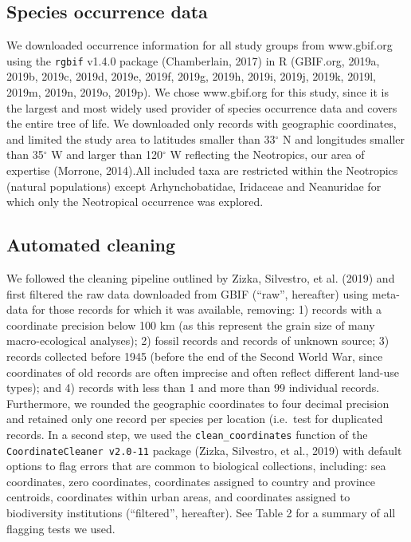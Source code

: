 \documentclass[
  12pt,
]{article}
\begin{document}
\hypertarget{species-occurrence-data}{%
\subsection{Species occurrence data}\label{species-occurrence-data}}

We downloaded occurrence information for all study groups from www.gbif.org using the \texttt{rgbif} v1.4.0 package (Chamberlain, 2017) in R (GBIF.org, 2019a, 2019b, 2019c, 2019d, 2019e, 2019f, 2019g, 2019h, 2019i, 2019j, 2019k, 2019l, 2019m, 2019n, 2019o, 2019p). We chose www.gbif.org for this study, since it is the largest and most widely used provider of species occurrence data and covers the entire tree of life. We downloaded only records with geographic coordinates, and limited the study area to latitudes smaller than 33\(^\circ\) N and longitudes smaller than 35\(^\circ\) W and larger than 120\(^\circ\) W reflecting the Neotropics, our area of expertise (Morrone, 2014).All included taxa are restricted within the Neotropics (natural populations) except Arhynchobatidae, Iridaceae and Neanuridae for which only the Neotropical occurrence was explored.

\hypertarget{automated-cleaning}{%
\subsection{Automated cleaning}\label{automated-cleaning}}

We followed the cleaning pipeline outlined by Zizka, Silvestro, et al. (2019) and first filtered the raw data downloaded from GBIF (``raw'', hereafter) using meta-data for those records for which it was available, removing: 1) records with a coordinate precision below 100 km (as this represent the grain size of many macro-ecological analyses); 2) fossil records and records of unknown source; 3) records collected before 1945 (before the end of the Second World War, since coordinates of old records are often imprecise and often reflect different land-use types); and 4) records with less than 1 and more than 99 individual records. Furthermore, we rounded the geographic coordinates to four decimal precision and retained only one record per species per location (i.e.~test for duplicated records. In a second step, we used the \texttt{clean\_coordinates} function of the \texttt{CoordinateCleaner\ v2.0-11} package (Zizka, Silvestro, et al., 2019) with default options to flag errors that are common to biological collections, including: sea coordinates, zero coordinates, coordinates assigned to country and province centroids, coordinates within urban areas, and coordinates assigned to biodiversity institutions (``filtered'', hereafter). See Table 2 for a summary of all flagging tests we used.
\end{document}

